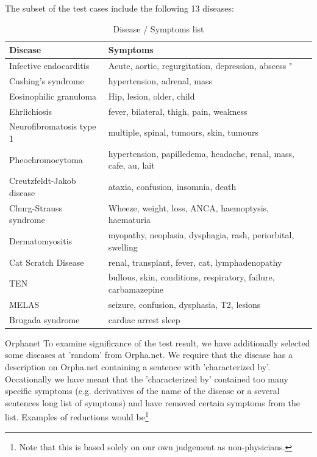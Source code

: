 The subset of the \cite{HangwiTang11102006} test cases include the
following 13 diseases:

\begin{table}[!h]
\caption{Disease / Symptoms list}
\begin{tabular}{|l|p{7cm}|}
\hline
Disease & Symptoms \\
\hline
Infective endocarditis & Acute, aortic,  regurgitation, depression,  abscess " \\
\hline
Cushing's syndrome & hypertension, adrenal, mass \\
\hline
Eosinophilic granuloma & Hip, lesion, older, child \\
\hline
Ehrlichiosis & fever, bilateral, thigh, pain, weakness \\
\hline
Neurofibromatosis type 1 & multiple, spinal, tumours, skin, tumours \\
\hline
Pheochromocytoma & hypertension, papilledema, headache, renal, mass, cafe, au, lait \\
\hline
Creutzfeldt-Jakob disease & ataxia, confusion, insomnia, death \\
\hline
Churg-Strauss syndrome & Wheeze, weight, loss, ANCA, haemoptysis, haematuria \\
\hline
Dermatomyositis & myopathy, neoplasia, dysphagia, rash, periorbital, swelling \\
\hline
Cat Scratch Disease & renal, transplant, fever, cat, lymphadenopathy \\
\hline
TEN & bullous, skin, conditions, respiratory, failure, carbamazepine \\
\hline
MELAS & seizure, confusion, dysphasia, T2, lesions \\
\hline
Brugada syndrome & cardiac arrest sleep \\
\hline
\end{tabular}
\end{table}

Orphanet
To examine significance of the test result, we have additionally selected some diseases at 'random' from Orpha.net. We require that the disease has a description on Orpha.net containing a sentence with 'characterized by'. Occationally we have meant that the 'characterized by' contained too many specific symptoms (e.g. derivatives of the name of the disease or a several sentences long list of symptoms) and have removed certain symptoms from the list. Examples of reductions would be\footnote{Note that this is based solely on our own judgement as non-physicians.}

